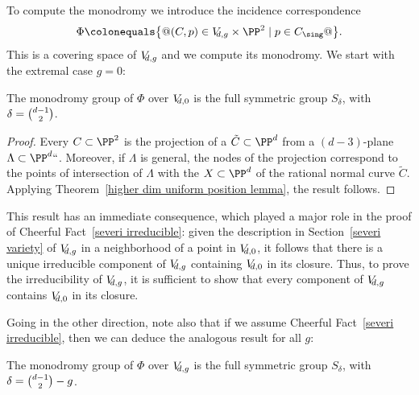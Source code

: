 To compute the monodromy we introduce the incidence correspondence
$$
\Phi \colonequals \big\{@(C, p) \in \VD{g} \times \PP^2 \mid p \in C_{\sing}
@\big\}.
$$
This is a
covering space of $\VD{g}$
and we compute its
monodromy. We start with the extremal case $g = 0$:

\begin{proposition}
The monodromy group of $\Phi$ over $\VD{0}$ is the full symmetric group
\label{plane curve nodes}
$S_\delta$, with $\delta = \tbinom{d-1}{2}$.
\end{proposition}

\begin{proof}
Every 
%
$C \subset \PP^2$ is the projection of a
%
$\tilde C \subset \PP^d$ from a $(d-3)$-plane
$\Lambda \subset \PP^d` `$. Moreover, if $\Lambda$ is general,  the nodes
of the projection correspond to the points of intersection of $\Lambda$
with the  
%
$X \subset \PP^d$ of the rational normal curve
$\tilde C$. Applying Theorem~\ref{higher dim uniform position lemma},
the result follows.
\end{proof}

This result has an immediate consequence, which played a major role in the
proof of Cheerful Fact~\ref{severi irreducible}: given the description in
Section~\ref{severi variety} of $\VD{g}$ in a neighborhood of a point
in $\VD{0}$, it follows that there is a unique irreducible component
of $\VD{g}$ containing $\VD{0}$ in its closure. Thus, to prove the
irreducibility of $\VD{g}$, it is sufficient to show that every component
of $\VD{g}$ contains $\VD{0}$ in its closure.

Going in the other direction, note also that if we assume Cheerful
Fact~\ref{severi irreducible}, then we can deduce the analogous result
for all $g$:


\begin{proposition}
The monodromy group of $\Phi$ over $\VD{g}$ is the full symmetric group
$S_\delta$, with $\delta = \tbinom{d-1}{2} - g$.
\end{proposition}



